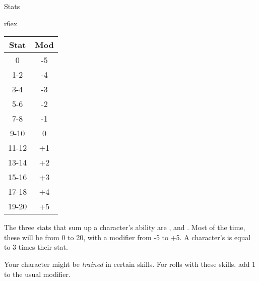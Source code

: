 
\begin{abstractsection}{Stats}

\begin{wraptable}[9]{r}{6ex}
  \small
\vspace*{-8ex}
\hspace*{-4.5ex}
\begin{tabular}{cc}
  Stat  & Mod \\
  \hline
  0     & -5       \\
  1-2   & -4       \\
  3-4   & -3       \\
  5-6   & -2       \\
  7-8   & -1       \\
  9-10  &  0       \\
  11-12 & +1       \\
  13-14 & +2       \\
  15-16 & +3       \\
  17-18 & +4       \\
  19-20 & +5
\end{tabular}
\end{wraptable}

The three stats that sum up a character's ability are ,  and . Most of the time, these will be from 0 to 20, with a modifier from -5 to +5. A character's  is equal to 3 times their  stat.

Your character might be \emph{trained} in certain skills. For rolls with these skills, add 1 to the usual modifier.
\end{abstractsection}

